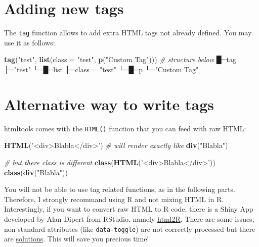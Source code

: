 \documentclass[
]{book}
\newenvironment{Shaded}{\begin{snugshade}}{\end{snugshade}}
\newcommand{\CommentTok}[1]{\textcolor[rgb]{0.56,0.35,0.01}{\textit{#1}}}
\newcommand{\DataTypeTok}[1]{\textcolor[rgb]{0.13,0.29,0.53}{#1}}
\newcommand{\KeywordTok}[1]{\textcolor[rgb]{0.13,0.29,0.53}{\textbf{#1}}}
\newcommand{\NormalTok}[1]{#1}
\newcommand{\StringTok}[1]{\textcolor[rgb]{0.31,0.60,0.02}{#1}}
\begin{document}
\hypertarget{adding-new-tags}{%
\section{Adding new tags}\label{adding-new-tags}}

The \texttt{tag} function allows to add extra HTML tags not already defined. You may use it as follows:

\begin{Shaded}
\begin{Highlighting}[]
\KeywordTok{tag}\NormalTok{(}\StringTok{"test"}\NormalTok{, }\KeywordTok{list}\NormalTok{(}\DataTypeTok{class =} \StringTok{"test"}\NormalTok{, }\KeywordTok{p}\NormalTok{(}\StringTok{"Custom Tag"}\NormalTok{)))}
\CommentTok{# structure below}
\NormalTok{█─tag }
\NormalTok{├─}\StringTok{"test"} 
\NormalTok{└─█─list }
\NormalTok{├─class =}\StringTok{ "test"} 
\NormalTok{└─█─p }
\NormalTok{└─}\StringTok{"Custom Tag"} 
\end{Highlighting}
\end{Shaded}

\hypertarget{alternative-way-to-write-tags}{%
\section{Alternative way to write tags}\label{alternative-way-to-write-tags}}

htmltools comes with the \texttt{HTML()} function that you can feed with raw HTML:

\begin{Shaded}
\begin{Highlighting}[]
\KeywordTok{HTML}\NormalTok{(}\StringTok{'<div>Blabla</div>'}\NormalTok{)}
\CommentTok{# will render exactly like}
\KeywordTok{div}\NormalTok{(}\StringTok{"Blabla"}\NormalTok{)}

\CommentTok{# but there class is different}
\KeywordTok{class}\NormalTok{(}\KeywordTok{HTML}\NormalTok{(}\StringTok{'<div>Blabla</div>'}\NormalTok{))}
\KeywordTok{class}\NormalTok{(}\KeywordTok{div}\NormalTok{(}\StringTok{"Blabla"}\NormalTok{))}
\end{Highlighting}
\end{Shaded}

You will not be able to use tag related functions, as in the following parts.
Therefore, I strongly recommand using R and not mixing HTML in R. Interestingly, if
you want to convert raw HTML to R code, there is a Shiny App developed by Alan
Dipert from RStudio, namely \href{https://github.com/alandipert/html2r}{html2R}. There
are some issues, non standard attributes (like \texttt{data-toggle}) are not correctly processed but there are \href{https://github.com/alandipert/html2r/issues/2}{solutions}. This will save you precious time!
\end{document}

